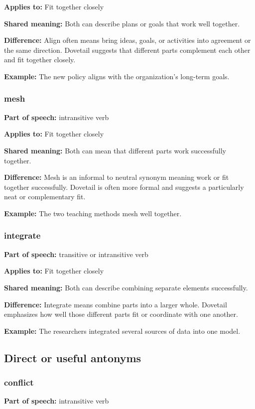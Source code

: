 \documentclass[11pt]{article}
\begin{document}
\textbf{Applies to:} Fit together closely

\textbf{Shared meaning:} Both can describe plans or goals that work well together.

\textbf{Difference:} Align often means bring ideas, goals, or activities into agreement or the same direction. Dovetail suggests that different parts complement each other and fit together closely.

\textbf{Example:} The new policy aligns with the organization's long-term goals.

\subsubsection{mesh}
\textbf{Part of speech:} intransitive verb

\textbf{Applies to:} Fit together closely

\textbf{Shared meaning:} Both can mean that different parts work successfully together.

\textbf{Difference:} Mesh is an informal to neutral synonym meaning work or fit together successfully. Dovetail is often more formal and suggests a particularly neat or complementary fit.

\textbf{Example:} The two teaching methods mesh well together.

\subsubsection{integrate}
\textbf{Part of speech:} transitive or intransitive verb

\textbf{Applies to:} Fit together closely

\textbf{Shared meaning:} Both can describe combining separate elements successfully.

\textbf{Difference:} Integrate means combine parts into a larger whole. Dovetail emphasizes how well those different parts fit or coordinate with one another.

\textbf{Example:} The researchers integrated several sources of data into one model.

\subsection{Direct or useful antonyms}
\subsubsection{conflict}
\textbf{Part of speech:} intransitive verb
\end{document}
